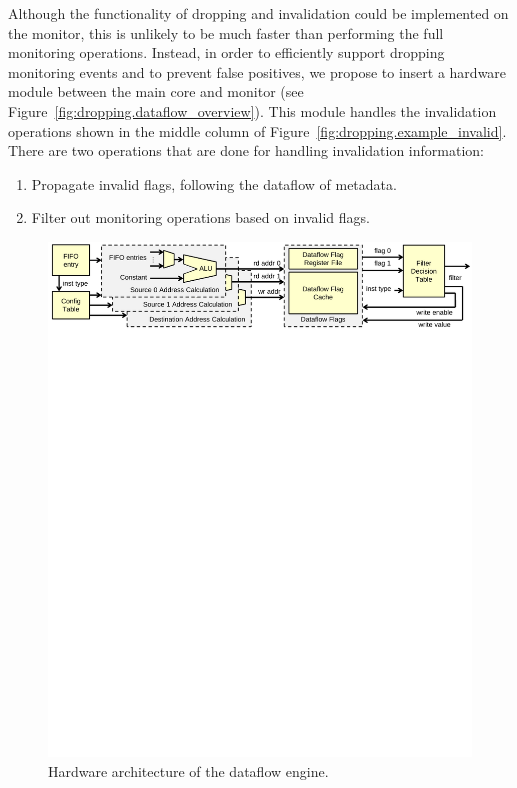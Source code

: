 Although the functionality of dropping and invalidation could be implemented on
the monitor, this is unlikely to be much faster than performing the full monitoring
operations.
Instead, in order to efficiently support dropping monitoring events and to prevent false
positives, we propose to insert a hardware module between the main core and
monitor (see Figure~\ref{fig:dropping.dataflow_overview}). 
This module handles the invalidation operations shown in the middle column of
Figure~\ref{fig:dropping.example_invalid}.
There are two operations that are done for handling invalidation information:

\begin{enumerate}
  \item Propagate invalid flags, following the dataflow of metadata.
  \item Filter out monitoring operations based on invalid flags.
\end{enumerate}

\begin{figure}
  \begin{center}
    \includegraphics[]{figs/dataflow_architecture.pdf}
    \vspace{-0.1in}
    \caption{Hardware architecture of the dataflow engine.}
    \label{fig:dropping.dataflow} 
    \vspace{-0.1in}
  \end{center}
\end{figure}


